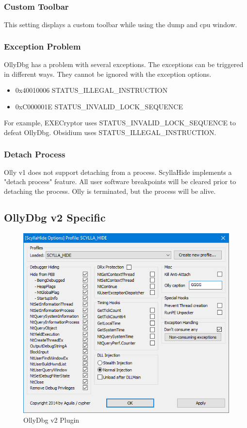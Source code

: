 \documentclass[10pt,a4paper]{article}
\begin{document}
\subsubsection{Custom Toolbar}
This setting displays a custom toolbar while using the dump and cpu window.


\subsubsection{Exception Problem}
OllyDbg has a problem with several exceptions. The exceptions can be triggered in different ways. They cannot be ignored with the exception options.

\begin{itemize}
\item 0x40010006 STATUS\_ILLEGAL\_INSTRUCTION
\item 0xC000001E STATUS\_INVALID\_LOCK\_SEQUENCE
\end{itemize}

For example, EXECryptor uses STATUS\_INVALID\_LOCK\_SEQUENCE to defeat OllyDbg. Obsidium uses STATUS\_ILLEGAL\_INSTRUCTION.

\subsubsection{Detach Process}
Olly v1 does not support detaching from a process. ScyllaHide implements a "detach process" feature. All user software breakpoints will be cleared prior to detaching the process. Olly is terminated, but the process will be alive.


\subsection{OllyDbg v2 Specific}

\begin{figure}[H]
\centering
\includegraphics[scale=1]{ollyv2plugin.PNG}
\caption{OllyDbg v2 Plugin}
\end{figure}
\end{document}
